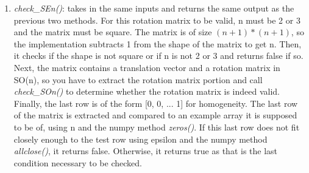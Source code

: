 \documentclass{article}
\begin{document}
\begin{enumerate}
\item \textit{check\_SEn()}: takes in the same inputs and returns the same output as the previous two methods. For this rotation matrix to be valid, n must be 2 or 3 and the matrix must be square. The matrix is of size \((n+1)*(n+1)\), so the implementation subtracts 1 from the shape of the matrix to get n. Then, it checks if the shape is not square or if n is not 2 or 3 and returns false if so. Next, the matrix contains a translation vector and a rotation matrix in SO(n), so you have to extract the rotation matrix portion and call \textit{check\_SOn()} to determine whether the rotation matrix is indeed valid. Finally, the last row is of the form [0, 0, ... 1] for homogeneity. The last row of the matrix is extracted and compared to an example array it is supposed to be of, using n and the numpy method \textit{zeros()}. If this last row does not fit closely enough to the test row using epsilon and the numpy method \textit{allclose()}, it returns false. Otherwise, it returns true as that is the last condition necessary to be checked.
\end{enumerate}
\end{document}
